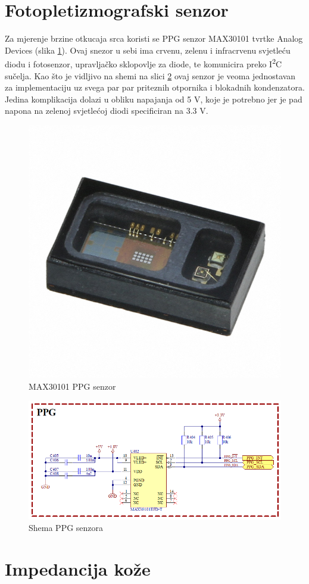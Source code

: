 \newpage
\section{Fotopletizmografski senzor}

Za mjerenje brzine otkucaja srca koristi se PPG senzor MAX30101 tvrtke Analog Devices (slika \ref{slk:MAX30101}). Ovaj snezor u sebi ima crvenu, zelenu i infracrvenu svjetleću diodu i fotosenzor, upravljačko sklopovlje za diode, te komunicira preko I\textsuperscript{2}C sučelja. Kao što je vidljivo na shemi na slici \ref{slk:PPG} ovaj senzor je veoma jednostavan za implementaciju uz svega par par priteznih otpornika i blokadnih kondenzatora. Jedina komplikacija dolazi u obliku napajanja od 5 V, koje je potrebno jer je pad napona na zelenoj svjetlećoj diodi specificiran na 3.3 V.
\begin{figure}[htb]
    \centering
    \includegraphics[width=6 cm]{Figures/MAX30101.JPG}
    \caption{MAX30101 PPG senzor}
    \label{slk:MAX30101}
\end{figure}
\begin{figure}[htb]
    \centering
    \includegraphics[width=\textwidth]{Figures/PPG.png}
    \caption{Shema PPG senzora}
    \label{slk:PPG}
\end{figure}

\section{Impedancija kože}